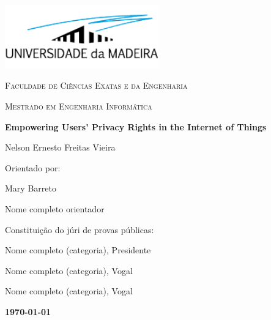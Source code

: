 %
%

\begin{titlepage}
    \centering
    \addtolength{\hoffset}{0.5cm}
        \centering
        \includegraphics[width=0.50\textwidth]{assets/images/uma_logo.png}\par\vspace{0.5cm}
        {\scshape\LARGE {} Faculdade de Ciências Exatas e da Engenharia \par}
        \vspace{1cm}
        {\scshape\Large Mestrado em Engenharia Informática \par}
        \vspace{1.5cm}
        {\huge\bfseries Empowering Users' Privacy Rights in the Internet of Things \par}
        \vspace{2cm}
        {\Large Nelson Ernesto Freitas Vieira\par}
        \vfill
        {\large Orientado por: \par}
            Mary Barreto \par
            Nome completo orientador \par
        \vfill
        {\large Constituição do júri de provas públicas: \par}
            Nome completo (categoria), Presidente \par
            Nome completo (categoria), Vogal \par
            Nome completo (categoria), Vogal \par
        \vfill
        {\large \bfseries \today \par}
    \end{titlepage}
